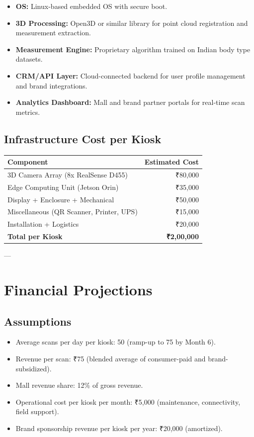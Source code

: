 \documentclass[12pt,a4paper]{article}
\begin{document}
\begin{itemize}
    \item \textbf{OS:} Linux-based embedded OS with secure boot.
    \item \textbf{3D Processing:} Open3D or similar library for point cloud registration and measurement extraction.
    \item \textbf{Measurement Engine:} Proprietary algorithm trained on Indian body type datasets.
    \item \textbf{CRM/API Layer:} Cloud-connected backend for user profile management and brand integrations.
    \item \textbf{Analytics Dashboard:} Mall and brand partner portals for real-time scan metrics.
\end{itemize}

\subsection{Infrastructure Cost per Kiosk}

\begin{tabular}{lr}
\toprule
Component & Estimated Cost \\
\midrule
3D Camera Array (8x RealSense D455) & ₹80,000 \\
Edge Computing Unit (Jetson Orin) & ₹35,000 \\
Display + Enclosure + Mechanical & ₹50,000 \\
Miscellaneous (QR Scanner, Printer, UPS) & ₹15,000 \\
Installation + Logistics & ₹20,000 \\
\midrule
\textbf{Total per Kiosk} & \textbf{₹2,00,000} \\
\bottomrule
\end{tabular}

---

\section{Financial Projections}

\subsection{Assumptions}

\begin{itemize}
    \item Average scans per day per kiosk: 50 (ramp-up to 75 by Month 6).
    \item Revenue per scan: ₹75 (blended average of consumer-paid and brand-subsidized).
    \item Mall revenue share: 12\% of gross revenue.
    \item Operational cost per kiosk per month: ₹5,000 (maintenance, connectivity, field support).
    \item Brand sponsorship revenue per kiosk per year: ₹20,000 (amortized).
\end{itemize}
\end{document}
